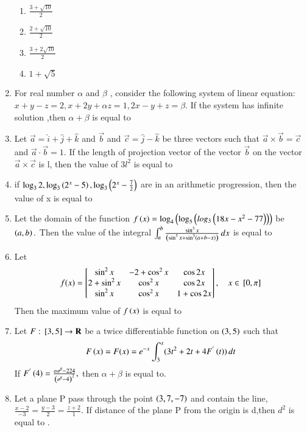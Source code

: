 \documentclass[journal]{IEEEtran}
\begin{document}
\begin{enumerate}[start=16]
\begin{multicols}{2}
    \begin{enumerate}
        \item $\frac{3+\sqrt{10}}{2}$
        \item $\frac{2+\sqrt{10}}{2}$
        \item $\frac{3+2\sqrt{10}}{2}$
        \item $1+\sqrt{5}$
    \end{enumerate}
\end{multicols}
\bigskip
\item For real number $\alpha$ and $\beta$ , consider the following system of linear equation:
$x+y-z=2,x+2y+\alpha z=1,2x-y+z=\beta.$ If the system has infinite solution ,then $\alpha+\beta$ is equal to 
\bigskip
\item Let $  \overrightarrow{a} = \hat{i} + \hat{j} + \hat{k}
$ and $\overrightarrow{b}$ and $\vec{c} =  \hat{j} - \hat{k}$
 be three vectors such that $\overrightarrow{a} \times \overrightarrow{b}=\overrightarrow{c}$ and $\overrightarrow{a}\cdot \overrightarrow{b} =1.$ If the length of projection vector of the vector $\overrightarrow{b}$ on the vector $\overrightarrow{a} \times \overrightarrow{c}$
 is l, then the value of $3l^{2}$ is equal to \bigskip
 \item if $\log_3 2, \log_3\left(2^{x}-5\right),\log_3\left(2^{x}-\frac{7}{2}\right)$ are in an arithmetic progression, then the value of x is equal to 
\bigskip
\item Let the domain of the function $f\left(x\right)=\log_4\left(\log_5\left(log_3\left(18x-x^{2}-77\right)\right)\right)$ be $\left(a,b\right).$ Then the value of the integral $\int_{a}^{b} \frac{\sin^{3} x}{\left(\sin^{3} x + \sin^{3}\left(a + b - x\right)\right)}\, dx$ is equal to 
 \bigskip
 \item Let \[
f(x) = \begin{bmatrix}
\sin^{2} x & -2 + \cos^{2} x & \cos 2x \\
2 + \sin^{2} x & \cos^{2}x & \cos 2x \\
\sin^{2} x & \cos^{2} x & 1 + \cos 2x
\end{bmatrix}, \quad x \in {}\left[0, \pi\right]
\]
Then the maximum value of $f\left(x\right) $ is equal to \bigskip
\item Let $F :{}\left[3, 5\right] \to \mathbf{R}$ be a twice differentiable function on $\left(3,5\right)$ such that \[F\left(x\right)=F(x) = e^{-x} \int_{3}^{x} (3t^{2} + 2t + 4F^{'}\left(t\right)) \, dt\] If $ F^{'}\left(4\right)=\frac{\alpha e^{\beta}-224}{\left(e^{\beta}-4\right)^{2}},$ then $\alpha+\beta$ is equal to.
\bigskip
\item Let a plane P pass through the point $\left(3,7,-7\right)$ and contain the line, $\frac{x-2}{-3}=\frac{y-3}{2}=\frac{z+2}{1}.$ If distance of the plane P from the origin is d,then $d^{2}$ is equal to .\bigskip

\end{enumerate}
\end{document}
